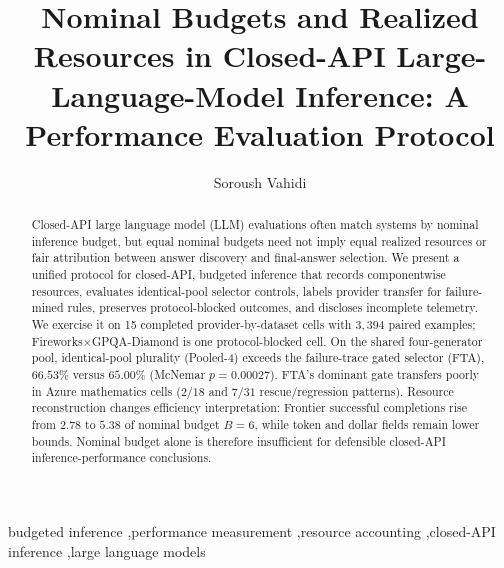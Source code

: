 \title{Nominal Budgets and Realized Resources in Closed-API Large-Language-Model Inference: A Performance Evaluation Protocol}

\author[aff1]{Soroush Vahidi}


\address[aff1]{Ying Wu College of Computing, New Jersey Institute of Technology, Newark, New Jersey, USA}

\begin{abstract}
Closed-API large language model (LLM) evaluations often match systems by nominal inference budget,
but equal nominal budgets need not imply equal realized resources or fair attribution between answer
discovery and final-answer selection. We present a unified protocol for closed-API, budgeted
inference that records componentwise resources, evaluates identical-pool selector controls, labels
provider transfer for failure-mined rules, preserves protocol-blocked outcomes, and discloses
incomplete telemetry. We exercise it on 15 completed provider-by-dataset cells with $3{,}394$ paired
examples; Fireworks$\times$GPQA-Diamond is one protocol-blocked cell. On the shared four-generator
pool, identical-pool plurality (Pooled-4) exceeds the failure-trace gated selector (FTA), $66.53\%$
versus $65.00\%$ (McNemar $p{=}0.00027$). FTA's dominant gate transfers poorly in Azure mathematics
cells ($2/18$ and $7/31$ rescue/regression patterns). Resource reconstruction changes efficiency
interpretation: Frontier successful completions rise from $2.78$ to $5.38$ of nominal budget
$B{=}6$, while token and dollar fields remain lower bounds. Nominal budget alone is therefore
insufficient for defensible closed-API inference-performance conclusions.
\end{abstract}

\begin{keyword}
budgeted inference \sep performance measurement \sep resource accounting \sep closed-API inference \sep large language models
\end{keyword}
